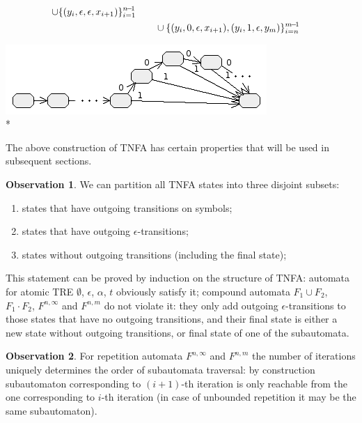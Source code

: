 \documentclass{article}
\newenvironment{Xfig}
    {\par\medskip\noindent\minipage{\linewidth}\begin{center}}
    {\end{center}\endminipage\par\medskip}
\theoremstyle{definition}
\newtheorem{Xobs}{Observation}
\begin{document}
\begin{multicols}{2}
\begin{align*}
                \cup \{(y_i, \epsilon, \epsilon, x_{i+1})\}_{i=1}^{n\!-\!1} \\
                & \hphantom{\hspace{2em}}
                    \cup \{(y_i, 0, \epsilon, x_{i+1}), (y_i, 1, \epsilon, y_m)\}_{i=n}^{m\!-\!1}
    \end{align*}
%
\begin{Xfig}
\includegraphics[width=0.9\linewidth]{img/tnfa_repeat_bound.png}\\*
\end{Xfig}

The above construction of TNFA has certain properties that will be used in subsequent sections.

\begin{Xobs}\label{obs_tnfa_states}
We can partition all TNFA states into three disjoint subsets:
\begin{enumerate}
    \item states that have outgoing transitions on symbols;
    \item states that have outgoing $\epsilon$-transitions;
    \item states without outgoing transitions (including the final state);
\end{enumerate}
This statement can be proved by induction on the structure of TNFA:
automata for atomic TRE $\emptyset$, $\epsilon$, $\alpha$, $t$ obviously satisfy it;
compound automata $F_1 \cup F_2$, $F_1 \cdot F_2$, $F^{n,\infty}$ and $F^{n,m}$
do not violate it:
they only add outgoing $\epsilon$-transitions to those states that have no outgoing transitions,
and their final state is either a new state without outgoing transitions,
or final state of one of the subautomata.
\end{Xobs}

\begin{Xobs}\label{obs_tnfa_repeat}
For repetition automata $F^{n,\infty}$ and $F^{n,m}$
the number of iterations uniquely determines the order of subautomata traversal:
by construction subautomaton corresponding to $(i \!+\! 1)$-th iteration is only reachable
from the one corresponding to $i$-th iteration
(in case of unbounded repetition it may be the same subautomaton).
\end{Xobs}


\end{multicols}
\end{document}
